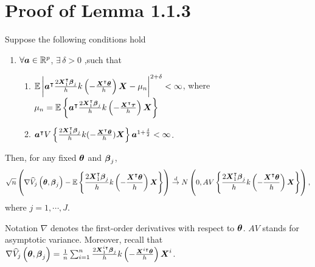 \section{Proof of Lemma 1.1.3}
\begin{lemma}
	Suppose the following conditions hold 
	\begin{enumerate}
		\item $\forall \boldsymbol{a} \in \mathbb{R}^p$, $\exists \,\delta > 0$ ,such that 
		\begin{enumerate}
			\item $\mathbb{E}\left|\boldsymbol{a}^{\intercal}\frac{2\boldsymbol{X}_{1}^{\intercal}\boldsymbol{\beta}_j}{h}k\left(-\frac{\boldsymbol{X}^{\intercal}\boldsymbol{\theta}}{h}\right)\boldsymbol{X}-\mu_{n}\right|^{2+\delta} < \infty$, where $\mu_{n}=\mathbb{E}\left\{\boldsymbol{a^{\intercal}}\frac{2\boldsymbol{X}_{1}^{\intercal}\boldsymbol{\beta}_{j}}{h}k\left(-\frac{\boldsymbol{X}^{\intercal}\boldsymbol{\tau}}{h}\right)\boldsymbol{X}\right\}$
			\item $\boldsymbol{\boldsymbol{a}^{\intercal}}V\left\{\frac{2\boldsymbol{X}^{\intercal}_{1}\boldsymbol{\beta}_j}{h}k(-\frac{\boldsymbol{X}^{\intercal}\boldsymbol{\theta}}{h})\boldsymbol{X}\right\}\boldsymbol{a} ^{1+\frac{\delta}{2}}< \infty$.
		\end{enumerate}
	\end{enumerate} 
	Then, for any fixed $\boldsymbol{\theta}$ and $\boldsymbol{\beta}_j$,
	\begin{gather}
	\begin{flalign*}
	\sqrt{n}\left(\nabla\widehat{V}_j\left(\boldsymbol{\theta}, \boldsymbol{\beta}_j\right) -  \mathbb{E} \left\{\frac{2\boldsymbol{X}_{1}^{\intercal}\boldsymbol{\beta}_{j}}{h}k\left(-\frac{\boldsymbol{X}^{\intercal}\boldsymbol{\theta}}{h}\right)\boldsymbol{X}\right\}\right)\overset{d}{\to}N\left(0,AV\left\{\frac{2\boldsymbol{X}_1^{\intercal}\boldsymbol{\beta}_j}{h}k\left(-\frac{\boldsymbol{X}^{\intercal}\boldsymbol{\theta}}{h}\right)\boldsymbol{X}\right\}\right),
	\end{flalign*}
	\end{gather}
	where $j = 1, \cdots, J$.
\end{lemma}
Notation $\nabla$ denotes the first-order derivatives with respect to $\boldsymbol{\theta}$. $AV$ stands for asymptotic variance. Moreover, recall that $\nabla\widehat{V}_j\left(\boldsymbol{\theta}, \boldsymbol{\beta}_j\right)=\frac{1}{n}\sum_{i=1}^{n}\frac{2\boldsymbol{X}_{1}^{i\intercal}\boldsymbol{\beta}_{j}}{h}k\left(-\frac{\boldsymbol{X}^{i\intercal}\boldsymbol{\theta}}{h}\right)\boldsymbol{X}^{i}$.
